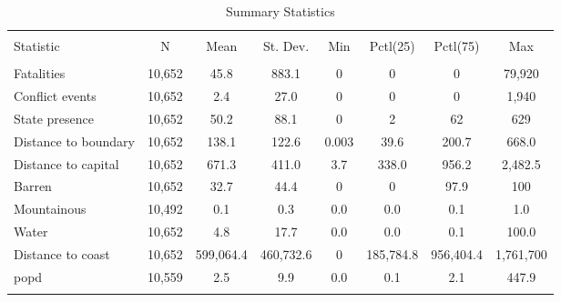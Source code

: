 
\begin{table}[!htbp] \centering 
  \caption{Summary Statistics} 
  \label{summarystats} 
\begin{tabular}{@{\extracolsep{1pt}}lccccccc} 
\\[-1.8ex]\hline 
\hline \\[-1.8ex] 
Statistic & \multicolumn{1}{c}{N} & \multicolumn{1}{c}{Mean} & \multicolumn{1}{c}{St. Dev.} & \multicolumn{1}{c}{Min} & \multicolumn{1}{c}{Pctl(25)} & \multicolumn{1}{c}{Pctl(75)} & \multicolumn{1}{c}{Max} \\ 
\hline \\[-1.8ex] 
Fatalities & 10,652 & 45.8 & 883.1 & 0 & 0 & 0 & 79,920 \\ 
Conflict events & 10,652 & 2.4 & 27.0 & 0 & 0 & 0 & 1,940 \\ 
State presence & 10,652 & 50.2 & 88.1 & 0 & 2 & 62 & 629 \\ 
Distance
		    to boundary & 10,652 & 138.1 & 122.6 & 0.003 & 39.6 & 200.7 & 668.0 \\ 
Distance to capital & 10,652 & 671.3 & 411.0 & 3.7 & 338.0 & 956.2 & 2,482.5 \\ 
Barren & 10,652 & 32.7 & 44.4 & 0 & 0 & 97.9 & 100 \\ 
Mountainous & 10,492 & 0.1 & 0.3 & 0.0 & 0.0 & 0.1 & 1.0 \\ 
Water & 10,652 & 4.8 & 17.7 & 0.0 & 0.0 & 0.1 & 100.0 \\ 
Distance to coast & 10,652 & 599,064.4 & 460,732.6 & 0 & 185,784.8 & 956,404.4 & 1,761,700 \\ 
popd & 10,559 & 2.5 & 9.9 & 0.0 & 0.1 & 2.1 & 447.9 \\ 
\hline \\[-1.8ex] 
\end{tabular} 
\end{table} 
